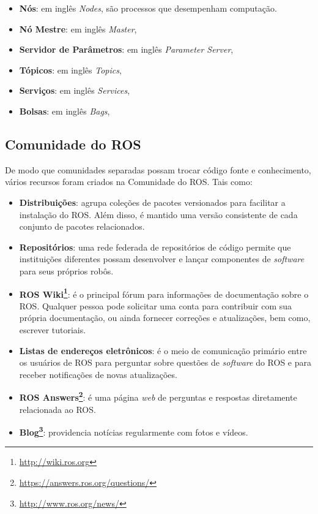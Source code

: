             \begin{itemize}
                \item \textbf{Nós}: em inglês \textit{Nodes}, são processos que desempenham computação. 
                
                \item \textbf{Nó Mestre}: em inglês \textit{Master},
                
                \item \textbf{Servidor de Parâmetros}: em inglês \textit{Parameter Server},
                
                \item \textbf{Tópicos}: em inglês \textit{Topics},
                
                \item \textbf{Serviços}: em inglês \textit{Services},
                
                \item \textbf{Bolsas}: em inglês \textit{Bags},
            \end{itemize}
            
        \subsection{Comunidade do ROS}
        
            De modo que comunidades separadas possam trocar código fonte e conhecimento, vários recursos foram criados na Comunidade do ROS. Tais como:
            
            \begin{itemize}
                \item \textbf{Distribuições}: agrupa coleções de pacotes versionados para facilitar a instalação do ROS. Além disso, é mantido uma versão consistente de cada conjunto de pacotes relacionados.
                \item \textbf{Repositórios}: uma rede federada de repositórios de código permite que instituições diferentes possam desenvolver e lançar componentes de \textit{software} para seus próprios robôs.
                \item \textbf{ROS Wiki\footnote{\url{http://wiki.ros.org}}}: é o principal fórum para informações de documentação sobre o ROS. Qualquer pessoa pode solicitar uma conta para contribuir com sua própria documentação, ou ainda fornecer correções e atualizações, bem como, escrever tutoriais.
                \item \textbf{Listas de endereços eletrônicos}: é o meio de comunicação primário entre os usuários de ROS para perguntar sobre questões de \textit{software} do ROS e para receber notificações de novas atualizações.
                \item \textbf{ROS Answers\footnote{\url{https://answers.ros.org/questions/}}}: é uma página \textit{web} de perguntas e respostas diretamente relacionada ao ROS.
                \item \textbf{Blog\footnote{\url{http://www.ros.org/news/}}}: providencia notícias regularmente com fotos e vídeos.
            \end{itemize}
        

